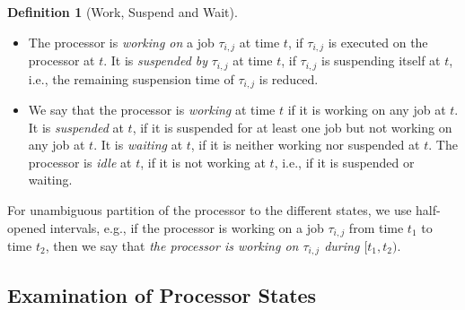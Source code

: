 \documentclass[conference]{IEEEtran}
\theoremstyle{definition}
\newtheorem{defn}[thm]{Definition}
\theoremstyle{remark}
\begin{document}
\begin{defn}[Work, Suspend and Wait]
	~
	\begin{itemize}
		\item  The processor is \emph{working on} a job $\tau_{i,j}$ at time $t$, if $\tau_{i,j}$ is executed on the processor at $t$.
		It is \emph{suspended by} $\tau_{i,j}$ at time $t$, if $\tau_{i,j}$ is suspending itself at $t$, i.e., the remaining suspension time of $\tau_{i,j}$ is reduced.
		\item We say that the processor is \emph{working} at time $t$ if it is working on any job at $t$.
		It is \emph{suspended} at $t$, if it is suspended for at least one job but not working on any job at $t$.
		It is \emph{waiting} at $t$, if it is neither working nor suspended at $t$. The processor is \emph{idle} at $t$, if it is not working at $t$, i.e., if it is suspended or waiting.
	\end{itemize}
\end{defn}

For unambiguous partition of the processor to the different states, we use half-opened intervals, e.g., if the processor is working on a job $\tau_{i,j}$ from time $t_1$ to time $t_2$, then we say that \emph{the processor is working on $\tau_{i,j}$ during $[t_1,t_2)$}.

\subsection{Examination of Processor States}
\label{sec:processor_states}
	
\end{document}
